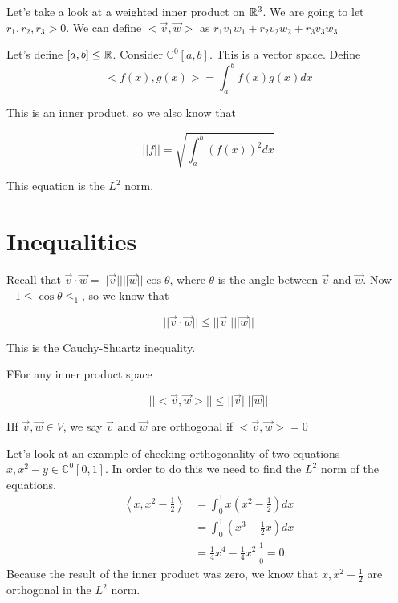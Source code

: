 	Let's take a look at a weighted inner product on $\mathbb{R}^3$. We are going to let $r_1,r_2,r_3>0$. We can define $<\vec{v},\vec{w}>$ as $r_1v_1w_1+r_2v_2w_2+r_3v_3w_3$

	\begin{problem}
		Let's define $[a,b]\le\mathbb{R}$. Consider $\mathbb{C}^0[a,b]$. This is a vector space. Define 
		\begin{equation}
			<f(x),g(x)> = \int_a^bf(x)g(x)dx
		\end{equation}

		This is an inner product, so we also know that

		\begin{equation}
			| | f | | = \sqrt{\int_a^b\left(f(x)\right)^2dx}
		\end{equation}

		This equation is the $L^2$ norm.
	\end{problem}

\section{Inequalities}

	Recall that $\vec{v}\cdot\vec{w} = | | \vec{v} | | | | \vec{w} | |\cos\theta$, where $\theta$ is the angle between $\vec{v}$ and $\vec{w}$. Now $-1\le\cos\theta\le_1$, so we know that 
	
	\begin{equation}
		| | \vec{v}\cdot\vec{w} | | \le | | \vec{v} | | | | \vec{w} | |
	\end{equation}

	This is the Cauchy-Shuartz inequality.

	\begin{theorem}
		FFor any inner product space

		\begin{equation}
			||<\vec{v},\vec{w}>||\le | | \vec{v}  | | | | \vec{w} | |
		\end{equation}
	\end{theorem}

	\begin{definition}
		IIf $\vec{v},\vec{w}\in V$, we say $\vec{v}$ and $\vec{w}$ are orthogonal if $<\vec{v},\vec{w}> = 0$
	\end{definition}

	\begin{problem}
		Let's look at an example of checking orthogonality of two equations $x,x^2-y\in\mathbb{C}^0[0,1]$. In order to do this we need to find the $L^2$ norm of the equations.
		\begin{align*}
			\left<x,x^2-\frac{1}{2}\right> &= \int_0^1x\left(x^2-\frac{1}{2}\right)dx\\
					    &=\int_0^1\left(x^3-\frac{1}{2}x\right)dx\\
					    &=\left.\frac{1}{4}x^4-\frac{1}{4}x^2\right|_0^1=0
		.\end{align*}	
		Because the result of the inner product was zero, we know that $x,x^2-\frac{1}{2}$ are orthogonal in the $L^2$ norm.
	\end{problem}

